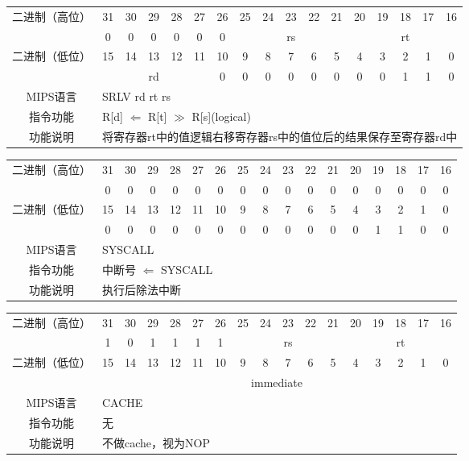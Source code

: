 \begin{table}
\begin{tabular}{|c|c|c|c|c|c|c|c|c|c|c|c|c|c|c|c|c|}
\hline
\multirow{2}{*}{二进制（高位）} &
31&30&29&28&27&26&25&24&23&22&21&20&19&18&17&16\\
\cline{2-17}
&
0&0&0&0&0&
0&
\multicolumn{5}{c|}{rs}&
\multicolumn{5}{c|}{rt}\\
\hline
\multirow{2}{*}{二进制（低位）} &
15&14&13&12&11&10&9&8&7&6&5&4&3&2&1&0\\
\cline{2-17}
&
\multicolumn{5}{c|}{rd} &
0&0&0&0&0&
0&0&0&1&1&
0\\
\hline
MIPS语言&
\multicolumn{16}{l|}{SRLV rd rt rs}\\
\hline
指令功能&
\multicolumn{16}{l|}{R[d] $\Leftarrow$ R[t] $\gg$ R[s](logical)}\\
\hline
功能说明&
\multicolumn{16}{l|}{将寄存器rt中的值逻辑右移寄存器rs中的值位后的结果保存至寄存器rd中}\\
\hline
\end{tabular}
\end{table}

\clearpage

\begin{table}
\begin{tabular}{|c|c|c|c|c|c|c|c|c|c|c|c|c|c|c|c|c|}
\hline
\multirow{2}{*}{二进制（高位）} &
31&30&29&28&27&26&25&24&23&22&21&20&19&18&17&16\\
\cline{2-17}
&
0&0&0&0&0&
0&0&0&0&0&
0&0&0&0&0&
0\\
\hline
\multirow{2}{*}{二进制（低位）} &
15&14&13&12&11&10&9&8&7&6&5&4&3&2&1&0\\
\cline{2-17}
&
0&0&0&0&0&
0&0&0&0&0&
0&0&1&1&0&
0\\
\hline
MIPS语言&
\multicolumn{16}{l|}{SYSCALL}\\
\hline
指令功能&
\multicolumn{16}{l|}{中断号 $\Leftarrow$ SYSCALL}\\
\hline
功能说明&
\multicolumn{16}{l|}{执行后除法中断}\\
\hline
\end{tabular}
\end{table}

\begin{table}
\begin{tabular}{|c|c|c|c|c|c|c|c|c|c|c|c|c|c|c|c|c|}
\hline
\multirow{2}{*}{二进制（高位）} &
31&30&29&28&27&26&25&24&23&22&21&20&19&18&17&16\\
\cline{2-17}
&
1&0&1&1&1&
1&
\multicolumn{5}{c|}{rs}&
\multicolumn{5}{c|}{rt}\\
\hline
\multirow{2}{*}{二进制（低位）} &
15&14&13&12&11&10&9&8&7&6&5&4&3&2&1&0\\
\cline{2-17}
&
\multicolumn{16}{c|}{immediate}\\
\hline
MIPS语言&
\multicolumn{16}{l|}{CACHE}\\
\hline
指令功能&
\multicolumn{16}{l|}{无}\\
\hline
功能说明&
\multicolumn{16}{l|}{不做cache，视为NOP}\\
\hline
\end{tabular}
\end{table}

